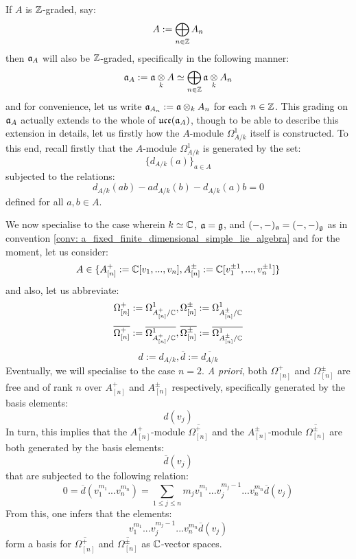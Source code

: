 \begin{remark}
                If $A$ is $\mathbb{Z}$-graded, say:
                    $$A := \bigoplus_{n \in \mathbb{Z}} A_n$$
                then $\mathfrak{a}_A$ will also be $\mathbb{Z}$-graded, specifically in the following manner:
                    $$\a_A := \a \tensor_k A \cong \bigoplus_{n \in \Z} \a \tensor_k A_n$$
                and for convenience, let us write $\a_{A_n} := \a \tensor_k A_n$ for each $n \in \mathbb{Z}$. This grading on $\mathfrak{a}_A$ actually extends to the whole of $\mathfrak{uce}(\mathfrak{a}_A)$, though to be able to describe this extension in details, let us firstly how the $A$-module $\Omega^1_{A/k}$ itself is constructed. To this end, recall firstly that the $A$-module $\Omega^1_{A/k}$ is generated by the set:
                    $$\{d_{A/k}(a)\}_{a \in A}$$
                subjected to the relations:
                    $$d_{A/k}(ab) - a d_{A/k}(b) - d_{A/k}(a) b = 0$$
                defined for all $a, b \in A$. 

                We now specialise to the case wherein $k \simeq \mathbb{C}$, $\mathfrak{a} = \mathfrak{g}$, and $(-, -)_{\mathfrak{a}} = (-, -)_{\mathfrak{g}}$ as in convention \ref{conv: a_fixed_finite_dimensional_simple_lie_algebra} and for the moment, let us consider:
                    $$A \in \{ A_{[n]}^+ := \mathbb{C}[v_1, ..., v_n], A_{[n]}^{\pm} := \mathbb{C}[v_1^{\pm 1}, ..., v_n^{\pm 1}] \}$$
                and also, let us abbreviate:
                    $$\Omega^+_{[n]} := \Omega^1_{A_{[n]}^+/\mathbb{C}}, \Omega^{\pm}_{[n]} := \Omega^1_{A_{[n]}^{\pm}/\mathbb{C}}$$
                    $$\overline{\Omega^+_{[n]}} := \overline{\Omega^1_{A_{[n]}^+/\mathbb{C}}}, \overline{\Omega^{\pm}_{[n]}} := \overline{\Omega^1_{A_{[n]}^{\pm}/\mathbb{C}}}$$
                    $$d := d_{A/k}, \overline{d} := \overline{d_{A/k}}$$
                Eventually, we will specialise to the case $n = 2$. \textit{A priori}, both $\Omega^+_{[n]}$ and $\Omega^{\pm}_{[n]}$ are free and of rank $n$ over $A_{[n]}^+$ and $A_{[n]}^{\pm}$ respectively, specifically generated by the basis elements:
                    $$d(v_j)$$
                In turn, this implies that the $A_{[n]}^+$-module $\overline{\Omega^+_{[n]}}$ and the $A_{[n]}^{\pm}$-module $\overline{\Omega^{\pm}_{[n]}}$ are both generated by the basis elements:
                    $$\overline{d}(v_j)$$
                that are subjected to the following relation:
                    $$0 = \overline{d}( v_1^{m_1} ... v_n^{m_n} ) = \sum_{1 \leq j \leq n} m_j v_1^{m_1} ... v_j^{m_j - 1} ... v_n^{m_n} \overline{d}(v_j)$$
                From this, one infers that the elements:
                    $$v_1^{m_1} ... v_j^{m_j - 1} ... v_n^{m_n} \overline{d}(v_j)$$
                form a basis for $\overline{\Omega^+_{[n]}}$ and $\overline{\Omega^{\pm}_{[n]}}$ as $\mathbb{C}$-vector spaces. 


\end{remark}
